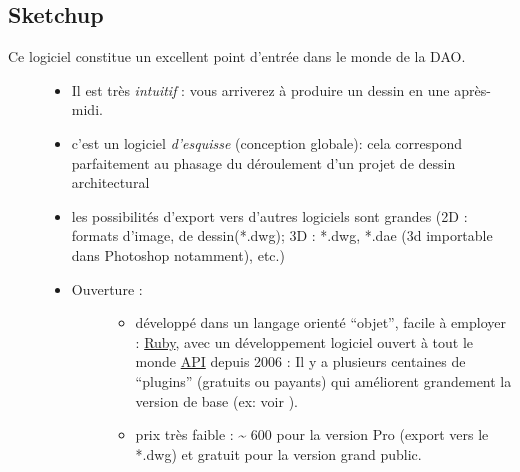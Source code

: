 \documentclass[a4paper,12pt,french]{sphinxmanual}
\begin{document}
\subsection{Sketchup}
\label{init_su+acad/002_demarrage:sketchup}\begin{description}
\item[{Ce logiciel constitue un excellent point d'entrée dans le monde de la DAO.}] \leavevmode\begin{itemize}
\item {} 
Il est très \emph{intuitif} : vous arriverez à produire un dessin en une après-midi.

\item {} 
c'est un logiciel \emph{d'esquisse} (conception globale): cela correspond parfaitement au phasage du déroulement d'un projet de dessin architectural

\item {} 
les possibilités d'export vers d'autres logiciels sont grandes (2D : formats d'image, de dessin(*.dwg); 3D : *.dwg, *.dae (3d importable dans Photoshop notamment), etc.)

\item {} \begin{description}
\item[{Ouverture :}] \leavevmode\begin{itemize}
\item {} 
développé dans un langage orienté ``objet'', facile à employer : \href{http://sketchup.google.com/intl/fr/download/rubyscripts.html}{Ruby},  avec un développement logiciel ouvert à tout le monde \href{http://code.google.com/intl/fr/apis/sketchup/docs/index.html}{API} depuis 2006 : Il y a plusieurs centaines de ``plugins'' (gratuits ou payants) qui améliorent grandement la version de base (ex: voir {\hyperref[su/config\string-su:config\string-su\string-02]{}}).

\item {} 
prix très faible : \textasciitilde{} 600 \texteuro{} pour la version Pro (export vers le *.dwg) et gratuit pour la version grand public.

\end{itemize}

\end{description}

\end{itemize}

\end{description}
\end{document}

